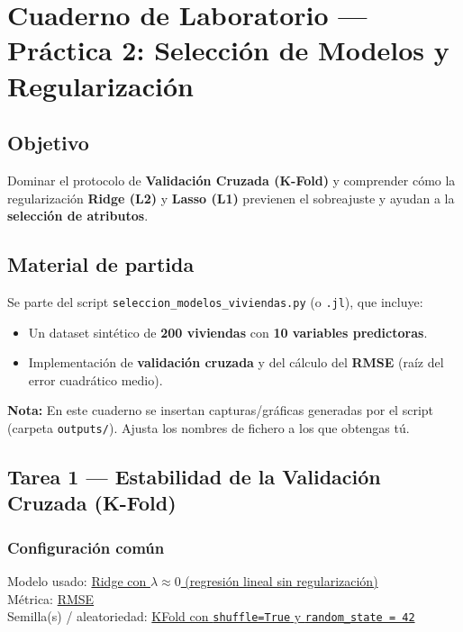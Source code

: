 
\chapter[Práctica 2 — Selección de Modelos]{Cuaderno de Laboratorio — Práctica 2: Selección de Modelos y Regularización}

\section*{Objetivo}
Dominar el protocolo de \textbf{Validación Cruzada (K-Fold)} y comprender cómo la regularización
\textbf{Ridge (L2)} y \textbf{Lasso (L1)} previenen el sobreajuste y ayudan a la \textbf{selección de atributos}.

\section*{Material de partida}
Se parte del script \texttt{seleccion\_modelos\_viviendas.py} (o \texttt{.jl}), que incluye:
\begin{itemize}
    \item Un dataset sintético de \textbf{200 viviendas} con \textbf{10 variables predictoras}.
    \item Implementación de \textbf{validación cruzada} y del cálculo del \textbf{RMSE} (raíz del error cuadrático medio).
\end{itemize}

\noindent\textbf{Nota:} En este cuaderno se insertan capturas/gráficas generadas por el script (carpeta \texttt{outputs/}).
Ajusta los nombres de fichero a los que obtengas tú.

\section{Tarea 1 — Estabilidad de la Validación Cruzada (K-Fold)}

\subsection*{Configuración común}
Modelo usado: \underline{Ridge con $\lambda \approx 0$ (regresión lineal sin regularización)}\\
Métrica: \underline{RMSE}\\
Semilla(s) / aleatoriedad: \underline{KFold con \texttt{shuffle=True} y \texttt{random\_state = 42}}\\

